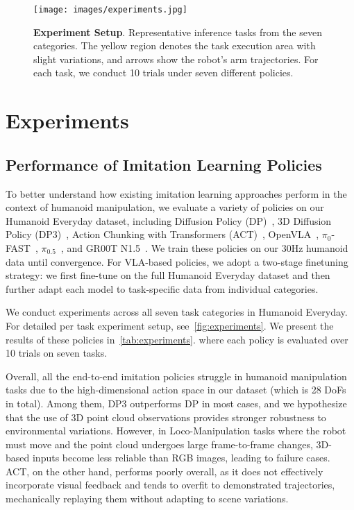 \documentclass[letterpaper, 10pt, conference]{ieeeconf}
\begin{document}
\begin{figure*}[t]
  \centering
  \texttt{[image: images/experiments.jpg]}
  \caption{\textbf{Experiment Setup}. Representative inference tasks from the seven categories. The yellow region denotes the task execution area with slight variations, and arrows show the robot’s arm trajectories. For each task, we conduct 10 trials under seven different policies.}
  \label{fig:experiments}
\end{figure*}


\section{Experiments}
\subsection{Performance of Imitation Learning Policies}
To better understand how existing imitation learning approaches perform in the context of humanoid manipulation, we evaluate a variety of policies on our Humanoid Everyday dataset, including Diffusion Policy (DP)~\cite{chi2023diffusion}, 3D Diffusion Policy (DP3)~\cite{ze20243d}, Action Chunking with Transformers (ACT)~\cite{zhao2023learning}, OpenVLA~\cite{kim2024openvla}, $\pi_{0}$-FAST~\cite{pertsch2025fast}, $\pi_{0.5}$~\cite{intelligence2025pi05visionlanguageactionmodelopenworld}, and GR00T N1.5~\cite{bjorck2025gr00tn1p5}. 
We train these policies on our 30Hz humanoid data until convergence.
For VLA-based policies, we adopt a two-stage finetuning strategy: we first fine-tune on the full Humanoid Everyday dataset and then further adapt each model to task-specific data from individual categories.\par



We conduct experiments across all seven task categories in Humanoid Everyday. For detailed per task experiment setup, see~\autoref{fig:experiments}. We present the results of these policies in~\autoref{tab:experiments}. where each policy is evaluated over 10 trials on seven tasks.

Overall, all the end-to-end imitation policies struggle in humanoid manipulation tasks due to the high-dimensional action space in our dataset (which is 28 DoFs in total). Among them, DP3 outperforms DP in most cases, and we hypothesize that the use of 3D point cloud observations provides stronger robustness to environmental variations. However, in Loco-Manipulation tasks where the robot must move and the point cloud undergoes large frame-to-frame changes, 3D-based inputs become less reliable than RGB images, leading to failure cases. ACT, on the other hand, performs poorly overall, as it does not effectively incorporate visual feedback and tends to overfit to demonstrated trajectories, mechanically replaying them without adapting to scene variations.\par
\end{document}
